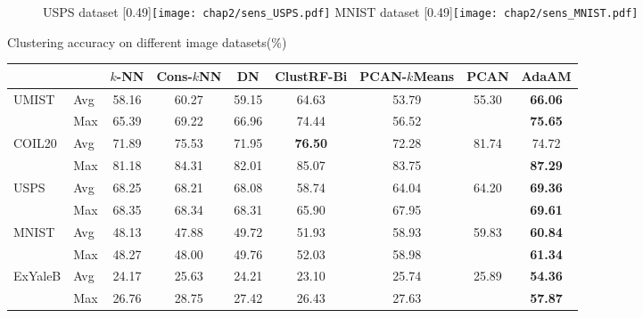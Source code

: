\begin{figure}[t]
	\centering
					{USPS dataset}
					[0.49\textwidth]{\texttt{[image: chap2/sens\_USPS.pdf]}}
					{MNIST dataset}
					[0.49\textwidth]{\texttt{[image: chap2/sens\_MNIST.pdf]}}
	\label{fig2:Sen2}
\end{figure} 
\begin{table}[t]
	{Clustering accuracy on different image datasets(\%)}
	\label{tab2:Acc}
	\centering
		\begin{tabular}{llccccccc}
			\toprule
			& &$k$-NN &Cons-$k$NN &DN &ClustRF-Bi &PCAN-$k$Means &PCAN& AdaAM
			\\
			\midrule
			\multirow{2}{*}{UMIST} & Avg & 58.16& 60.27& 59.15& 64.63& 53.79& \multirow{2}{*}{55.30}   & \textbf{66.06}\\
			& Max& 65.39& 69.22& 66.96& 74.44& 56.52&& \textbf{75.65}\\
			\midrule
			\multirow{2}{*}{COIL20} & Avg & 71.89& 75.53& 71.95& \textbf{76.50}& 72.28& \multirow{2}{*}{81.74}& 74.72\\
			& Max& 81.18& 84.31& 82.01& 85.07& 83.75&& \textbf{87.29}\\
			\midrule
			\multirow{2}{*}{USPS}  & Avg & 68.25& 68.21& 68.08& 58.74& 64.04& \multirow{2}{*}{64.20}  & \textbf{69.36}\\
			& Max& 68.35& 68.34& 68.31& 65.90& 67.95&& \textbf{69.61}\\
			\midrule
			\multirow{2}{*}{MNIST} & Avg & 48.13& 47.88& 49.72& 51.93& 58.93& \multirow{2}{*}{59.83}  & \textbf{60.84}\\
			& Max& 48.27& 48.00& 49.76& 52.03& 58.98&& \textbf{61.34}\\
			\midrule
			\multirow{2}{*}{ExYaleB} & Avg& 24.17& 25.63& 24.21& 23.10& 25.74& \multirow{2}{*}{25.89} & \textbf{54.36}\\
			& Max& 26.76& 28.75& 27.42& 26.43& 27.63&& \textbf{57.87}\\
			\bottomrule
		\end{tabular}
\end{table}

